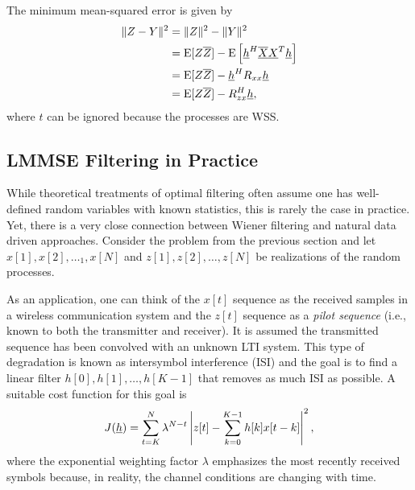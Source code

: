 The minimum mean-squared error is given by
\begin{equation*}
\begin{split}
\| Z-Y \|^2 &= \| Z \|^2 - \| Y \|^2 \\
&= \mathrm{E} [Z \overline{Z}] - \mathrm{E} \left[ \underline{h}^H \overline{\underline{X}} \underline{X}^T \underline{h} \right] \\
&= \mathrm{E} [Z \overline{Z}] - \underline{h}^H R_{xx} \underline{h} \\
&= \mathrm{E} [Z \overline{Z}] - R_{zx}^H \underline{h} ,
\end{split}
\end{equation*}
where $t$ can be ignored because the processes are WSS.

\subsection{LMMSE Filtering in Practice}

While theoretical treatments of optimal filtering often assume one has well-defined random variables with known statistics, this is rarely the case in practice.
Yet, there is a very close connection between Wiener filtering and natural data driven approaches.
Consider the problem from the previous section and let $x[1],x[2],\ldots_1,x[N]$ and $z[1],z[2],\ldots,z[N]$ be realizations of the random processes.

As an application, one can think of the $x[t]$ sequence as the received samples in a wireless communication system and the $z[t]$ sequence as a \emph{pilot sequence} (i.e., known to both the transmitter and receiver).
It is assumed the transmitted sequence has been convolved with an unknown LTI system.
This type of degradation is known as intersymbol interference (ISI) and the goal is to find a linear filter $h[0],h[1],\ldots,h[K-1]$ that removes as much ISI as possible.
A suitable cost function for this goal is
\[ J(\underline{h}) = \sum_{t=K}^N \lambda^{N-t} \left| z[t] - \sum_{k=0}^{K-1} h[k] x[t-k] \right|^2, \]
where the exponential weighting factor $\lambda$ emphasizes the most recently received symbols because, in reality, the channel conditions are changing with time.

